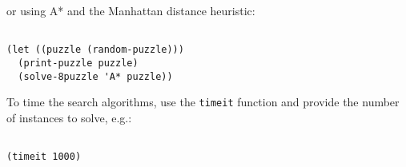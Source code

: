 \documentclass{article}
\begin{document}
or using A* and the Manhattan distance heuristic:

\begin{verbatim}

(let ((puzzle (random-puzzle)))
  (print-puzzle puzzle) 
  (solve-8puzzle 'A* puzzle))

\end{verbatim}

To time the search algorithms, use the \texttt{timeit} function and provide the
number of instances to solve, e.g.:

\begin{verbatim}

(timeit 1000)

\end{verbatim}
\end{document}
